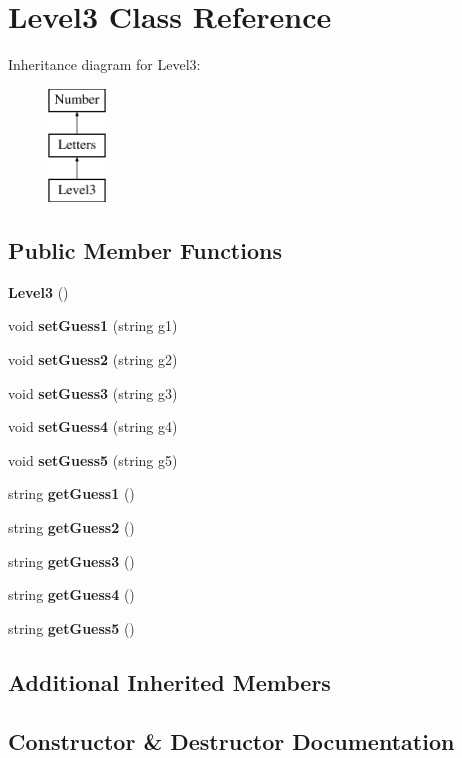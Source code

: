 \section{Level3 Class Reference}
\label{class_level3}
Inheritance diagram for Level3\+:\begin{figure}[H]
\begin{center}
\leavevmode
\includegraphics[height=3.000000cm]{class_level3}
\end{center}
\end{figure}
\subsection*{Public Member Functions}
\begin{DoxyCompactItemize}
\item 
\textbf{ Level3} ()
\item 
void \textbf{ set\+Guess1} (string g1)
\item 
void \textbf{ set\+Guess2} (string g2)
\item 
void \textbf{ set\+Guess3} (string g3)
\item 
void \textbf{ set\+Guess4} (string g4)
\item 
void \textbf{ set\+Guess5} (string g5)
\item 
string \textbf{ get\+Guess1} ()
\item 
string \textbf{ get\+Guess2} ()
\item 
string \textbf{ get\+Guess3} ()
\item 
string \textbf{ get\+Guess4} ()
\item 
string \textbf{ get\+Guess5} ()
\end{DoxyCompactItemize}
\subsection*{Additional Inherited Members}


\subsection{Constructor \& Destructor Documentation}
\mbox{\label{class_level3_ad28445ed9130610abb14a9182e76c008}} 
